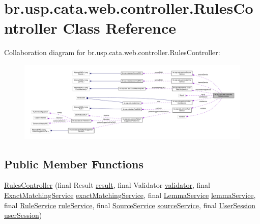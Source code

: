 \hypertarget{classbr_1_1usp_1_1cata_1_1web_1_1controller_1_1_rules_controller}{\section{br.\+usp.\+cata.\+web.\+controller.\+Rules\+Controller Class Reference}
\label{classbr_1_1usp_1_1cata_1_1web_1_1controller_1_1_rules_controller}
}


Collaboration diagram for br.\+usp.\+cata.\+web.\+controller.\+Rules\+Controller\+:\nopagebreak
\begin{figure}[H]
\begin{center}
\leavevmode
\includegraphics[width=350pt]{classbr_1_1usp_1_1cata_1_1web_1_1controller_1_1_rules_controller__coll__graph}
\end{center}
\end{figure}
\subsection*{Public Member Functions}
\begin{DoxyCompactItemize}
\item 
\hyperlink{classbr_1_1usp_1_1cata_1_1web_1_1controller_1_1_rules_controller_a58de786e9a99d85c6212c3adc26e35b9}{Rules\+Controller} (final Result \hyperlink{classbr_1_1usp_1_1cata_1_1web_1_1controller_1_1_rules_controller_a8e45948e75f80863ff4e806d5e65b812}{result}, final Validator \hyperlink{classbr_1_1usp_1_1cata_1_1web_1_1controller_1_1_rules_controller_ad401152db4ca88b16db6af85f197c9e2}{validator}, final \hyperlink{classbr_1_1usp_1_1cata_1_1service_1_1_exact_matching_service}{Exact\+Matching\+Service} \hyperlink{classbr_1_1usp_1_1cata_1_1web_1_1controller_1_1_rules_controller_a1d0b9b9de5f7ab54667cce7cf063ea5c}{exact\+Matching\+Service}, final \hyperlink{classbr_1_1usp_1_1cata_1_1service_1_1_lemma_service}{Lemma\+Service} \hyperlink{classbr_1_1usp_1_1cata_1_1web_1_1controller_1_1_rules_controller_a0d64ae4445b5f08567a759ac878fd46c}{lemma\+Service}, final \hyperlink{classbr_1_1usp_1_1cata_1_1service_1_1_rule_service}{Rule\+Service} \hyperlink{classbr_1_1usp_1_1cata_1_1web_1_1controller_1_1_rules_controller_a44a989236fbd708f51daf982a6612e3f}{rule\+Service}, final \hyperlink{classbr_1_1usp_1_1cata_1_1service_1_1_source_service}{Source\+Service} \hyperlink{classbr_1_1usp_1_1cata_1_1web_1_1controller_1_1_rules_controller_a0bdfd02330463311f5f1d872ed2a5825}{source\+Service}, final \hyperlink{classbr_1_1usp_1_1cata_1_1web_1_1controller_1_1_user_session}{User\+Session} \hyperlink{classbr_1_1usp_1_1cata_1_1web_1_1controller_1_1_rules_controller_aa92287f4621059a80c592dde106e3b3b}{user\+Session})
\end{DoxyCompactItemize}
